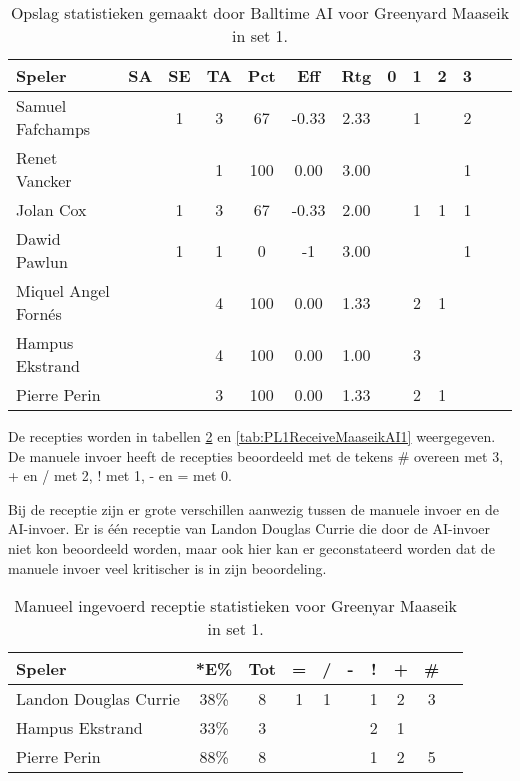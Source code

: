 \begin{table}[ht!]
  \centering
  \scriptsize
  \begin{tabular}{|l|c|c|c|c|c|c|c|c|c|c|c|c|} \hline
    \textbf{Speler} & SA & SE & TA & Pct & Eff & Rtg & 0 & 1 & 2 & 3 \\ \hline
    Samuel Fafchamps &  & 1 & 3 & 67 & -0.33 & 2.33 &  & 1 &  & 2  \\
    Renet Vancker &  &  & 1 & 100 & 0.00 & 3.00 &  &  &  & 1  \\
    Jolan Cox &  & 1 & 3 & 67 & -0.33 & 2.00 &  & 1 & 1 & 1 \\
    Dawid Pawlun &  & 1 & 1 & 0 & -1 & 3.00 &  &  &  & 1 \\
    Miquel Angel Fornés &  &  & 4 & 100 & 0.00 & 1.33 &  & 2 & 1 & \\
    Hampus Ekstrand &  &  & 4 & 100 & 0.00 & 1.00 &  & 3 &  & \\
    Pierre Perin &  &  & 3 & 100 & 0.00 & 1.33 &  & 2 & 1 & \\ \hline
  \end{tabular}
  \caption[Opslagstatistieken gemaakt door Balltime AI voor Greenyard Maaseik in set 1]{\label{tab:PL1ServeMaaseikAI1}Opslag statistieken gemaakt door Balltime AI voor Greenyard Maaseik in set 1.}
\end{table}

De recepties worden in tabellen \ref{tab:PL1ReceiveMaaseikMan1} en \ref{tab:PL1ReceiveMaaseikAI1} weergegeven. De manuele invoer heeft de recepties beoordeeld met de tekens \# overeen met 3, + en / met 2, ! met 1, - en = met 0.

Bij de receptie zijn er grote verschillen aanwezig tussen de manuele invoer en de AI-invoer. Er is één receptie van Landon Douglas Currie die door de AI-invoer niet kon beoordeeld worden, maar ook hier kan er geconstateerd worden dat de manuele invoer veel kritischer is in zijn beoordeling. 

\begin{table}[ht!]
    \centering
    \scriptsize
    \begin{tabular}{|l|c|c|c|c|c|c|c|c|c|}
        \hline
        \textbf{Speler} & *E\% & Tot & = & / & - & ! & + & \# \\ \hline
        Landon Douglas Currie & 38\% & 8 & 1 & 1 &  & 1 & 2 & 3 \\ 
        Hampus Ekstrand & 33\% & 3 &  &  &  & 2 & 1 &  \\ 
        Pierre Perin & 88\% & 8 &  &  &  & 1 & 2 & 5  \\ \hline
    \end{tabular}
    \caption[Manueel ingevoerde receptiestatistieken voor Greenyard Maaseik in set 1]{\label{tab:PL1ReceiveMaaseikMan1}Manueel ingevoerd receptie statistieken voor Greenyar Maaseik in set 1.}
\end{table}

